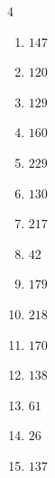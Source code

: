\begin{multicols}{4}
\begin{enumerate}
  \item $147$


  \item $120$


  \item $129$


  \item $160$


  \item $229$


  \item $130$


  \item $217$


  \item $42$


  \item $179$


  \item $218$


  \item $170$


  \item $138$


  \item $61$


  \item $26$


\columnbreak %

\resetques

  \item $137$



\end{enumerate}
\end{multicols}
